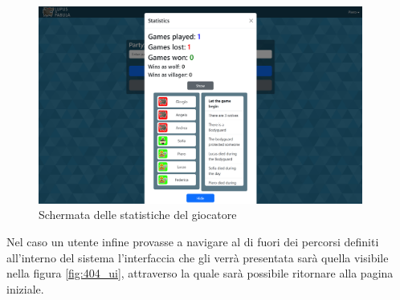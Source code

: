 \begin{figure}[H]
\begin{minipage}{0.25\textwidth}
    \end{minipage}\hfill
    \begin{minipage}{0.75\textwidth}
        \centering
        \includegraphics[width=0.95\textwidth]{img/screen/desktop/stats_desktop.png}
    \end{minipage}
    \caption{Schermata delle statistiche del giocatore}
    \label{fig:stats_ui}
\end{figure}

Nel caso un utente infine provasse a navigare al di fuori dei percorsi definiti all'interno del sistema l'interfaccia che gli verrà presentata sarà quella visibile nella figura \ref{fig:404_ui}, attraverso la quale sarà possibile ritornare alla pagina iniziale.


